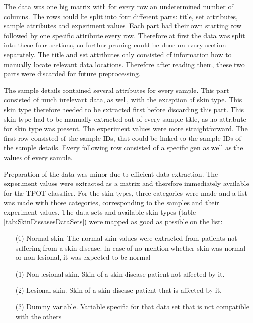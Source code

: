 \documentclass[10pt,a4paper]{article}
\begin{document}
	The data was one big matrix with for every row an undetermined number of columns. The rows could be split into four different parts: title, set attributes, sample attributes and experiment values. Each part had their own starting row followed by one specific attribute every row. Therefore at first the data was split into these four sections, so further pruning could be done on every section separately. The title and set attributes only consisted of information how to manually locate relevant data locations. Therefore after reading them, these two parts were discarded for future preprocessing.
	
	The sample details contained several attributes for every sample. This part consisted of much irrelevant data, as well, with the exception of skin type. This skin type therefore needed to be extracted first before discarding this part. This skin type had to be manually extracted out of every sample title, as no attribute for skin type was present. The experiment values were more straightforward. The first row consisted of the sample IDs, that could be linked to the sample IDs of the sample details. Every following row consisted of a specific gen as well as the values of every sample.
	
	Preparation of the data was minor due to efficient data extraction. The experiment values were extracted as a matrix and therefore immediately available for the TPOT classifier. For the skin types, three categories were made and a list was made with those categories, corresponding to the samples and their experiment values. The data sets and available skin types (table \ref{tab:SkinDiseasesDataSets}) were mapped as good as possible on the list: 
	
	\begin{enumerate}
		\item[(0)] Normal skin. The normal skin values were extracted from patients not suffering from a skin disease. In case of no mention whether skin was normal or non-lesional, it was expected to be normal
		\item[(1)] Non-lesional skin. Skin of a skin disease patient not affected by it.
		\item[(2)] Lesional skin. Skin of a skin disease patient that is affected by it.
		\item[(3)] Dummy variable. Variable specific for that data set that is not compatible with the others
	\end{enumerate}
\end{document}
